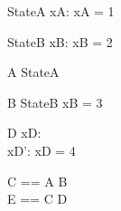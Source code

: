 \begin{schema}{StateA}
xA: \nat
\where
xA = 1
\end{schema}

\begin{schema}{StateB}
xB: \nat
\where
xB = 2
\end{schema}

\begin{schema}{A}
\Delta StateA
\end{schema}

\begin{schema}{B}
\Delta StateB
\where 
xB = 3
\end{schema}

\begin{schema}{D}
xD: \nat \\
xD': \nat
\where 
xD = 4
\end{schema}

\begin{zed}
C == A \lor B \\
E == C \lor D
\end{zed}

